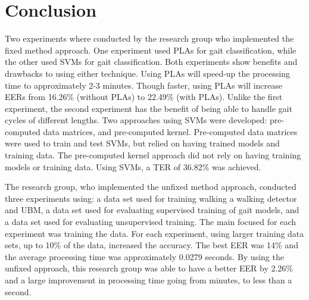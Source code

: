 \documentclass{sig-alternate}
\begin{document}

	
\section{Conclusion}
	
	
	Two experiments where conducted by the research group who implemented the fixed method approach. One experiment used PLAs for gait classification, while the other used SVMs for gait classification. Both experiments show benefits and drawbacks to using either technique. Using PLAs will speed-up the processing time to approximately 2-3 minutes. Though faster, using PLAs will increase EERs from 16.26\% (without PLAs) to 22.49\% (with PLAs). Unlike the first experiment, the second experiment has the benefit of being able to handle gait cycles of different lengths. Two approaches using SVMs were developed: pre-computed data matrices, and pre-computed kernel. Pre-computed data matrices were used to train and test SVMs, but relied on having trained models and training data. The pre-computed kernel approach did not rely on having training models or training data. Using SVMs, a TER of 36.82\% was achieved. 
	
		
		The research group, who implemented the unfixed method approach, conducted three experiments using: a data set used for training walking a walking detector and UBM, a data set used for evaluating supervised training of gait models, and a data set used for evaluating unsupervised training. The main focused for each experiment was training the data. For each experiment, using larger training data sets, up to 10\% of the data, increased the accuracy. The best EER was 14\% and the average processing time was approximately 0.0279 seconds. By using the unfixed approach, this research group was able to have a better EER by 2.26\% and a large improvement in processing time going from minutes, to less than a second.
\end{document}
